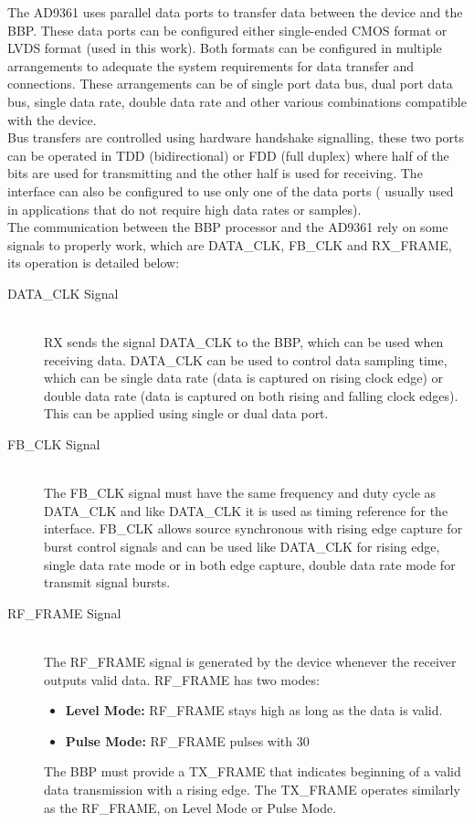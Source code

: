 The AD9361 uses parallel data ports to transfer data between the device and the BBP. These data ports can be configured either single-ended CMOS format or LVDS format (used in this work). Both formats can be configured in multiple arrangements to adequate the system requirements for data transfer and connections. These arrangements can be of single port data bus, dual port data bus, single data rate, double data rate and other various combinations compatible with the device.\\
Bus transfers are controlled using hardware handshake signalling, these two ports can be operated in TDD (bidirectional) or FDD (full duplex) where half of the bits are used for transmitting and the other half is used for receiving. The interface can also be configured to use only one of the data ports ( usually used in applications that do not require high data rates or samples).\\
The communication between the BBP processor and the AD9361 rely on some signals to properly work, which are DATA\_CLK, FB\_CLK and RX\_FRAME, its operation is detailed below:

\begin{description}
	\item[DATA\_CLK Signal] \hfill \\
	RX sends the signal DATA\_CLK to the BBP, which can be used when receiving data. DATA\_CLK can be used to control data sampling time, which can be single data rate (data is captured on rising clock edge) or double data rate (data is captured on both rising and falling clock edges). This can be applied using single or dual data port.

	\item[FB\_CLK Signal] \hfill \\
	The FB\_CLK signal must have the same frequency and duty cycle as DATA\_CLK and like DATA\_CLK it is used as timing reference for the interface. FB\_CLK allows source synchronous with rising edge capture for burst control signals and can be used like DATA\_CLK for rising edge, single data rate mode or in both edge capture, double data rate mode for transmit signal bursts.

	\item[RF\_FRAME Signal] \hfill \\
	The RF\_FRAME signal is generated by the device whenever the receiver outputs valid data. RF\_FRAME has two modes:
	\begin{itemize}
		\item \textbf{Level Mode:} RF\_FRAME stays high as long as the data is valid.
		\item \textbf{Pulse Mode:} RF\_FRAME pulses with 30%
	\end{itemize}
	The BBP must provide a TX\_FRAME that indicates beginning of a valid data transmission with a rising edge. The TX\_FRAME operates similarly as the RF\_FRAME, on Level Mode or Pulse Mode.

\end{description}

